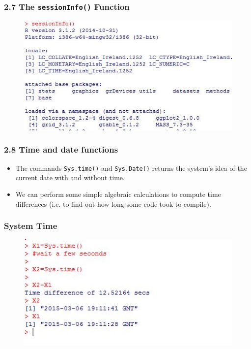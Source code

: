 \documentclass{beamer}
\begin{document}
 	\begin{frame}
 		
 		\frametitle{2.7 The \texttt{sessionInfo()} Function}
 		\begin{figure}
 			\centering
 			\includegraphics[width=0.99\linewidth]{images/sessionInfo}
 		\end{figure}
 	\end{frame}	
 	\begin{frame}
 		\frametitle{2.8 Time and date functions}
 		\begin{itemize}
 		\item The commands \texttt{Sys.time()} and \texttt{Sys.Date()} returns the system’s idea of the current date
 		with and without time. 
 		\item We can perform some simple algebraic calculations to compute time
 		differences (i.e. to find out how long some code took to compile).
 		\end{itemize}
 		
 	\end{frame}
 	\begin{frame}
 		\frametitle{System Time}
 		\begin{figure}
 			\centering
 			\includegraphics[width=1.2\linewidth]{images/Systime}
 		\end{figure}
 		
 	\end{frame}
\end{document}
